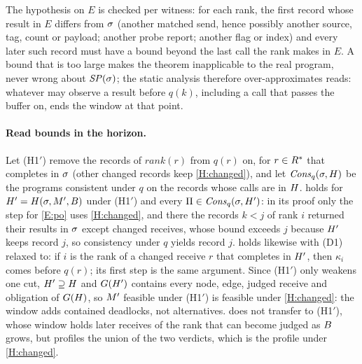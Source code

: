 The hypothesis on $E$ is checked per witness: for each rank, the first record whose result in
$E$ differs from $\sigma$ (another matched send, hence possibly another source, tag, count or
payload; another probe report; another flag or index) and every later such record must have a
bound beyond the last call the rank makes in $E$. A bound that is too large makes the theorem
inapplicable to the real program, never wrong about $\mathit{SP}(\sigma)$; the static analysis
therefore over-approximates reads: whatever may observe a result before $q(k)$, including a
call that passes the buffer on, ends the window at that point.

\paragraph{Read bounds in the horizon.} Let (H1$'$) remove the records of
$\mathit{rank}(r)$ from $q(r)$ on, for $r\in R^{*}$ that completes in $\sigma$ (other
changed records keep \ref{H:changed}), and let $\mathit{Cons}_q(\sigma,H)$ be the programs
consistent under $q$ on the records whose calls are in $H$.  holds for
$H'=H(\sigma,M',B)$ under (H1$'$) and every $\Pi\in\mathit{Cons}_q(\sigma,H')$: in its
proof only the step for \ref{E:po} uses \ref{H:changed}, and there the records $k<j$ of rank $i$
returned their results in $\sigma$ except changed receives, whose bound exceeds $j$ because
$H'$ keeps record $j$, so consistency under $q$ yields record $j$.  holds
likewise with (D1) relaxed to: if $i$ is the rank of a changed receive $r$ that completes in
$H'$, then $\kappa_i$ comes before $q(r)$; its first step is the same argument. Since
(H1$'$) only weakens one cut, $H'\supseteq H$ and $G(H')$ contains every node,
edge, judged receive and obligation of $G(H)$, so $M'$ feasible under (H1$'$) is
feasible under \ref{H:changed}: the window adds contained deadlocks, not alternatives. 
does not transfer to (H1$'$), whose window holds later receives of the rank that can become
judged as $B$ grows, but \tool profiles the union of the two verdicts, which is the profile
under \ref{H:changed}.
